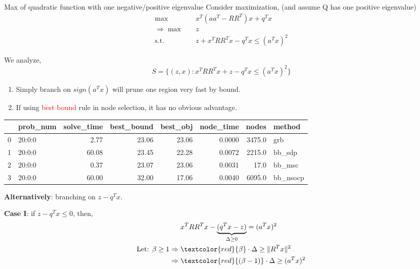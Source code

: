 \documentclass[aspectratio=1610, 10pt]{beamer}
\newcommand{\st}{\mathrm{s.t.\;}}
\newcommand{\red}[1]{\textcolor{red}{#1}}
\begin{document}
\begin{frame}[allowframebreaks]{Max of quadratic function with one negative/positive eigenvalue}
  Consider maximization, (and assume Q has one positive eigenvalue)
  \begin{align*}
    \max \quad             & x^T(aa^T-RR^T)x + q^Tx           \\
    \Rightarrow \max \quad & z                                \\
    \st \quad              & z + x^TRR^Tx - q^Tx \le (a^Tx)^2
  \end{align*}

  We analyze,
  \begin{equation*}
    S = \{(z, x): x^TRR^Tx + z - q^Tx \le (a^Tx)^2\}
  \end{equation*}

  \begin{enumerate}
    \item Simply branch on \(sign(a^Tx)\) will prune one region very fast by bound.
    \item If using \red{best bound} rule in node selection, it has no obvious advantage.
  \end{enumerate}

  \begin{tabular}{llrrrrrl}
    \toprule
    {} & prob\_num & solve\_time & best\_bound & best\_obj & node\_time & nodes  & method    \\
    \midrule
    0  & 20:0:0    & 2.77        & 23.06       & 23.06     & 0.0000     & 3475.0 & grb       \\
    1  & 20:0:0    & 60.08       & 23.45       & 22.28     & 0.0072     & 2215.0 & bb\_sdp   \\
    2  & 20:0:0    & 0.37        & 23.07       & 23.06     & 0.0031     & 17.0   & bb\_msc   \\
    3  & 20:0:0    & 60.00       & 32.00       & 17.06     & 0.0040     & 6095.0 & bb\_nsocp \\
    \bottomrule
  \end{tabular}
  \framebreak

  \textbf{Alternatively}: branching on \(z - q^Tx\).

  \textbf{Case I}: if \(z - q^Tx \le 0\), then,
  \begin{align*}
                                           & x^TRR^Tx - \underbrace{(q^Tx - z)}_{\Delta \ge 0} = (a^Tx)^2 \\
    \text{Let: }\beta \ge 1 \Rightarrow \; & \red{\beta}\cdot \Delta\ge \|R^Tx\|^2                        \\
    \Rightarrow \;                         & \red{(\beta - 1)}\cdot\Delta \ge (a^Tx)^2
  \end{align*}


\end{frame}
\end{document}
